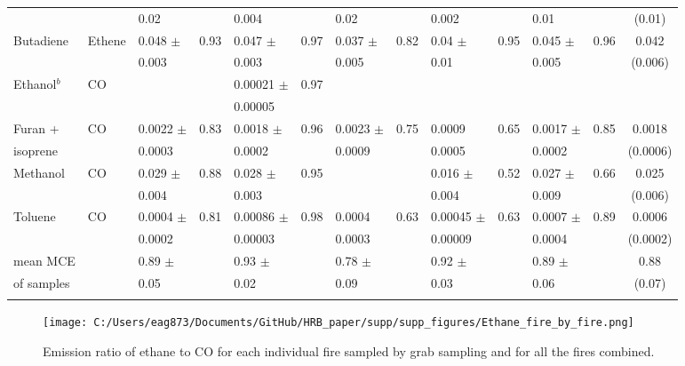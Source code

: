 \documentclass[acp, manuscript]{copernicus}
\begin{document}
\begin{sidewaystable}
\begin{tabular}{l l l l l l l l l l l l c }
    &&0.02&&0.004&&0.02&&0.002&&0.01&&(0.01)\\
    Butadiene & Ethene &0.048 $\pm$&0.93&0.047 $\pm$&0.97&0.037 $\pm$&0.82&0.04 $\pm$&0.95&0.045 $\pm$&0.96&0.042 \\
    &&0.003&&0.003&&0.005&&0.01&&0.005&&(0.006)\\
    Ethanol$^b$ & CO & & &0.00021 $\pm$&0.97&&&&&&& \\
     &&&&0.00005&&&&&&&&\\
    Furan +  & CO & 0.0022 $\pm$&0.83&0.0018 $\pm$&0.96&0.0023 $\pm$&0.75&0.0009&0.65&0.0017 $\pm$&0.85&0.0018 \\
    isoprene&&0.0003&&0.0002&&0.0009&&0.0005&&0.0002&&(0.0006)\\
    Methanol & CO & 0.029 $\pm$&0.88&0.028 $\pm$&0.95& &&0.016 $\pm$&0.52&0.027 $\pm$&0.66&0.025\\
     &&0.004&&0.003&&&&0.004&&0.009&&(0.006)\\
    Toluene& CO &0.0004 $\pm$&0.81&0.00086 $\pm$&0.98&0.0004&0.63&0.00045 $\pm$&0.63&0.0007 $\pm$&0.89&0.0006 \\
    &&0.0002&&0.00003&&0.0003&&0.00009&&0.0004&&(0.0002)\\
   mean MCE&&0.89 $\pm$&&0.93 $\pm$&&0.78 $\pm$&&0.92 $\pm$&&0.89 $\pm$&&0.88\\
  of samples &&0.05&&0.02&&0.09&&0.03&&0.06&&(0.07)\\
    \bottomhline 
  \end{tabular}
 \label{table:ER_by_fire}
\end{sidewaystable}



\begin{figure}
  \texttt{[image: C:/Users/eag873/Documents/GitHub/HRB\_paper/supp/supp\_figures/Ethane\_fire\_by\_fire.png]}
  \caption{Emission ratio of ethane to CO for each individual fire sampled by grab sampling and for all the fires combined. }
  \label{fig:Ethane}
\end{figure}
\end{document}
